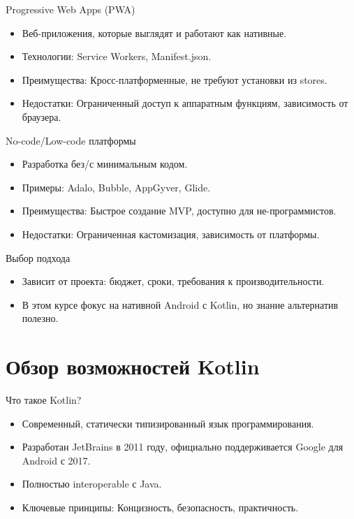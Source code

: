 \documentclass{beamer}
\begin{document}
\begin{frame}{Progressive Web Apps (PWA)}
  \begin{itemize}
    \item Веб-приложения, которые выглядят и работают как нативные.
    \item Технологии: Service Workers, Manifest.json.
    \item Преимущества: Кросс-платформенные, не требуют установки из stores.
    \item Недостатки: Ограниченный доступ к аппаратным функциям, зависимость от браузера.
  \end{itemize}
\end{frame}

\begin{frame}{No-code/Low-code платформы}
  \begin{itemize}
    \item Разработка без/с минимальным кодом.
    \item Примеры: Adalo, Bubble, AppGyver, Glide.
    \item Преимущества: Быстрое создание MVP, доступно для не-программистов.
    \item Недостатки: Ограниченная кастомизация, зависимость от платформы.
  \end{itemize}
\end{frame}

\begin{frame}{Выбор подхода}
  \begin{itemize}
    \item Зависит от проекта: бюджет, сроки, требования к производительности.
    \item В этом курсе фокус на нативной Android с Kotlin, но знание альтернатив полезно.
  \end{itemize}
\end{frame}

\section{Обзор возможностей Kotlin}

\begin{frame}{Что такое Kotlin?}
  \begin{itemize}
    \item Современный, статически типизированный язык программирования.
    \item Разработан JetBrains в 2011 году, официально поддерживается Google для Android с 2017.
    \item Полностью interoperable с Java.
    \item Ключевые принципы: Концизность, безопасность, практичность.
  \end{itemize}
\end{frame}
\end{document}
